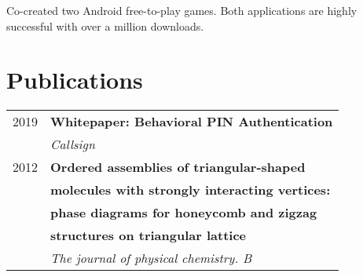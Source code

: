 \documentclass[10pt]{article} %
\begin{document}
{\begin{minipage}[t]{0.5\textwidth}
\normalsize{Co-created two Android free-to-play games.
Both applications are highly successful with over a million downloads.}\\

\end{minipage} %
\hfill
\begin{minipage}[t]{0.44\textwidth} %
\vspace{0pt} %





\section{Publications}

\begin{tabular}{rl}
2019	 & \textbf{Whitepaper: Behavioral PIN Authentication} \\
& \textit{Callsign} \\
2012	 & \textbf{Ordered assemblies of triangular-shaped} \\
         & \textbf{molecules with strongly interacting vertices:}\\
         & \textbf{phase diagrams for honeycomb and zigzag}\\
         & \textbf{structures on triangular lattice} \\
& \textit{The journal of physical chemistry. B}
\end{tabular}\\[10pt]


\end{minipage}}
\end{document}
